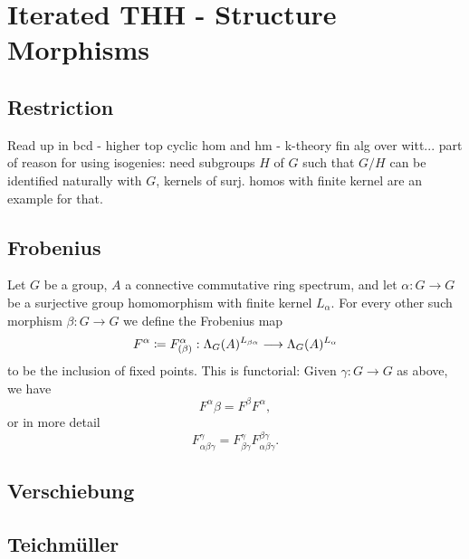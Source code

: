 \section{Iterated THH - Structure Morphisms}
\subsection{Restriction}
Read up in bcd - higher top cyclic hom and  hm - k-theory fin alg over witt...
part of reason for using isogenies: need subgroups $H$ of $G$ such that $G/H$ can be identified naturally with $G$, kernels of surj. homos with finite kernel are an example for that.
\subsection{Frobenius}
\begin{defn}\label{def_frobenius_and_functoriality}
Let $G$ be a group, $A$ a connective commutative ring spectrum, and let $\alpha : G \to G$ be a surjective group homomorphism with finite kernel $L_\alpha$. For every other such morphism $\beta: G \to G$ we define the Frobenius map
\[ F^\alpha \coloneqq F^\alpha_{(\beta)}: \Lambda_G(A)^{ L_{\beta\alpha} } \longrightarrow \Lambda_G(A)^{ L_\alpha } \]
to be the inclusion of fixed points. This is functorial: Given $\gamma: G \to G$ as above, we have
\[ F^\alpha\beta = F^\beta F^\alpha, \]
or in more detail
\[ F^{\gamma}_{\alpha\beta\gamma} = F^{\gamma}_{\beta\gamma} F^{\beta\gamma}_{\alpha\beta\gamma}. \]

\end{defn}

\subsection{Verschiebung}
\subsection{Teichm\"uller}
\begin{defn}\label{def_Delta_alpha}\cite[Sec. 6.2]{brun2010covering}
\comm{[insert here def of $\Delta_\alpha: A \to T^\alpha$[}
\end{defn}
\begin{prop}\label{prop_iso_degree_0_structure_map_lambda}\cite[Prop. 6.2.4]{brun2010covering}
\end{prop}
